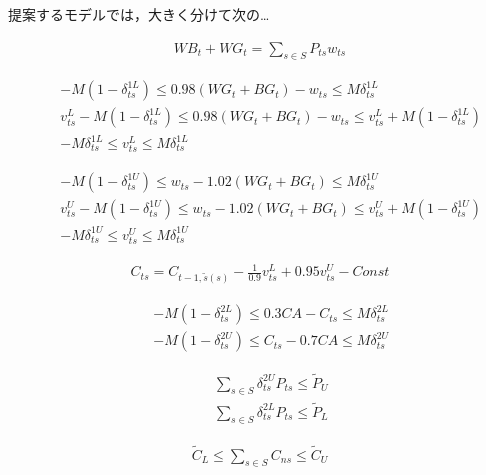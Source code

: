 \documentclass{jarticle}
\begin{document}
提案するモデルでは，大きく分けて次の…

\begin{eqnarray}
WB_t + WG_t = \sum_{s \in S} P_{ts} w_{ts}
  \label{eq:con1}
\end{eqnarray}

\begin{eqnarray}
&& - M (1 - \delta^{1L}_{ts})
  \le 0.98 (WG_t + BG_t) - w_{ts}
  \le M \delta^{1L}_{ts}
  \label{eq:con2} \\
&& v^L_{ts} - M (1 - \delta^{1L}_{ts})
  \le 0.98 (WG_t + BG_t) - w_{ts}
  \le v^L_{ts} + M (1 - \delta^{1L}_{ts})
  \label{eq:con3} \\
&& - M \delta^{1L}_{ts} \le v^L_{ts} \le M \delta^{1L}_{ts}
  \label{eq:con4}
\end{eqnarray}

\begin{eqnarray}
&& - M (1 - \delta^{1U}_{ts})
  \le w_{ts} - 1.02 (WG_t + BG_t)
  \le M \delta^{1U}_{ts}
  \label{eq:con5} \\
&& v^U_{ts} - M (1 - \delta^{1U}_{ts})
  \le w_{ts} - 1.02 (WG_t + BG_t)
  \le v^U_{ts} + M (1 - \delta^{1U}_{ts})
  \label{eq:con6} \\
&& - M \delta^{1U}_{ts} \le v^U_{ts} \le M \delta^{1U}_{ts}
  \label{eq:con7}
\end{eqnarray}

\begin{eqnarray}
C_{ts} = C_{t-1,\tilde{s}(s)} - \frac{1}{0.9} v^L_{ts} + 0.95 v^U_{ts}
  - Const
  \label{eq:con8}
\end{eqnarray}

\begin{eqnarray}
&& - M (1 - \delta^{2L}_{ts})
  \le 0.3 CA - C_{ts}
  \le M \delta^{2L}_{ts}
  \label{eq:con9} \\
&& - M (1 - \delta^{2U}_{ts})
  \le C_{ts} - 0.7 CA
  \le M \delta^{2U}_{ts}
  \label{eq:con10}
\end{eqnarray}

\begin{eqnarray}
&& \sum_{s \in S} \delta^{2U}_{ts} P_{ts}
  \le \tilde{P}_U
  \label{eq:con11} \\
&& \sum_{s \in S} \delta^{2L}_{ts} P_{ts}
  \le \tilde{P}_L
  \label{eq:con12}
\end{eqnarray}

\begin{eqnarray}
\tilde{C}_L
  \le \sum_{s \in S} C_{ns}
  \le \tilde{C}_U
  \label{eq:con13}
\end{eqnarray}
\end{document}
